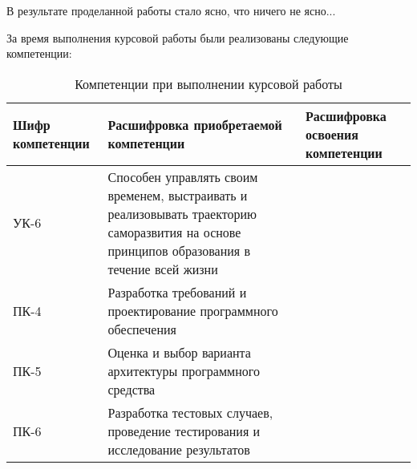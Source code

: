 \Conclusion %

В результате проделанной работы стало ясно, что ничего не ясно...

За время выполнения курсовой работы были реализованы следующие компетенции:
\begin{table}[h!]
\centering
\begin{tabular}{|p{3cm}|p{5cm}|p{7cm}|} 
    \hline
    Шифр \newline компетенции & Расшифровка \newline приобретаемой \newline компетенции & Расшифровка освоения \newline компетенции \\[0.5ex] 
        \hline
        УК-6 & Способен управлять своим временем, выстраивать и реализовывать траекторию саморазвития на основе принципов образования в течение всей жизни &  \\ \hline
        ПК-4 & Разработка требований и проектирование программного обеспечения & \\ \hline
        ПК-5 & Оценка и выбор варианта архитектуры программного средства & \\ \hline
        ПК-6 & Разработка тестовых случаев, проведение тестирования и исследование результатов & \\ 
 \hline
\end{tabular}
\caption{Компетенции при выполнении курсовой работы}
\label{table:1}
\end{table}

